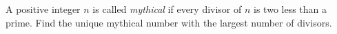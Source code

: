 A positive integer $n$ is called \emph{mythical} if every divisor of $n$ is two less than a prime.  Find the unique mythical number with the largest number of divisors.
